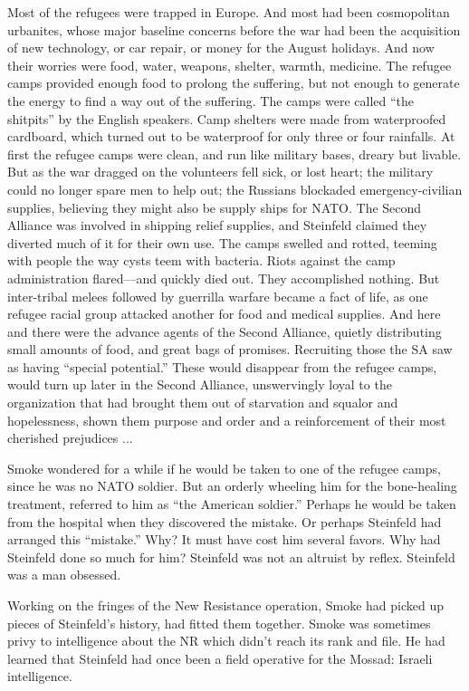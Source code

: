 Most of the refugees were trapped in Europe. And most had been cosmopolitan urbanites, whose major baseline concerns before the war had been the acquisition of new technology, or car repair, or money for the August holidays. And now their worries were food, water, weapons, shelter, warmth, medicine. The refugee camps provided enough food to prolong the suffering, but not enough to generate the energy to find a way out of the suffering. The camps were called ``the shitpits'' by the English speakers. Camp shelters were made from waterproofed cardboard, which turned out to be waterproof for only three or four rainfalls. At first the refugee camps were clean, and run like military bases, dreary but livable. But as the war dragged on the volunteers fell sick, or lost heart; the military could no longer spare men to help out; the Russians blockaded emergency-civilian supplies, believing they might also be supply ships for NATO. The Second Alliance was involved in shipping relief supplies, and Steinfeld claimed they diverted much of it for their own use. The camps swelled and rotted, teeming with people the way cysts teem with bacteria. Riots against the camp administration flared---and quickly died out. They accomplished nothing. But inter-tribal melees followed by guerrilla warfare became a fact of life, as one refugee racial group attacked another for food and medical supplies. And here and there were the advance agents of the Second Alliance, quietly distributing small amounts of food, and great bags of promises. Recruiting those the SA saw as having ``special potential.'' These would disappear from the refugee camps, would turn up later in the Second Alliance, unswervingly loyal to the organization that had brought them out of starvation and squalor and hopelessness, shown them purpose and order and a reinforcement of their most cherished prejudices ...

Smoke wondered for a while if he would be taken to one of the refugee camps, since he was no NATO soldier. But an orderly wheeling him for the bone-healing treatment, referred to him as ``the American soldier.'' Perhaps he would be taken from the hospital when they discovered the mistake. Or perhaps Steinfeld had arranged this ``mistake.'' Why? It must have cost him several favors. Why had Steinfeld done so much for him? Steinfeld was not an altruist by reflex. Steinfeld was a man obsessed.

Working on the fringes of the New Resistance operation, Smoke had picked up pieces of Steinfeld's history, had fitted them together. Smoke was sometimes privy to intelligence about the NR which didn't reach its rank and file. He had learned that Steinfeld had once been a field operative for the Mossad: Israeli intelligence.

